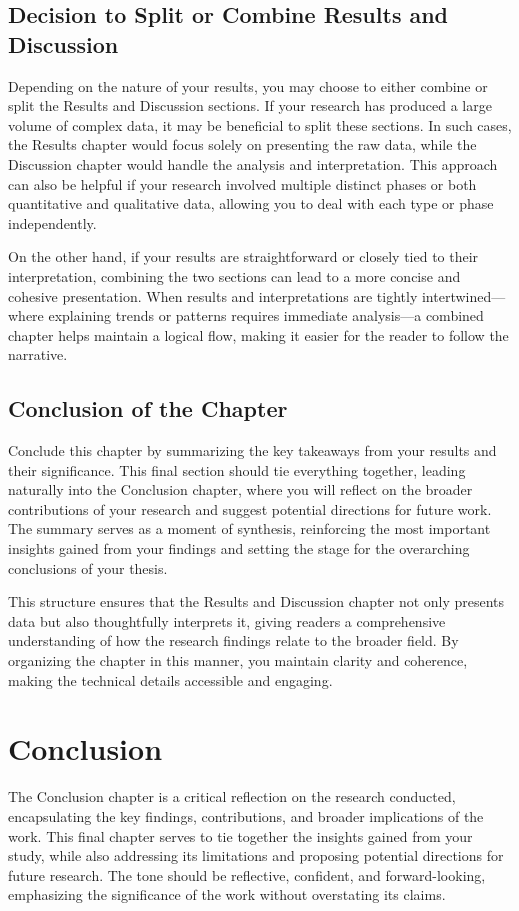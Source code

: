 \documentclass{iutbscthesis}
\begin{document}
\section{Decision to Split or Combine Results and Discussion}

Depending on the nature of your results, you may choose to either combine or split the Results and Discussion sections. If your research has produced a large volume of complex data, it may be beneficial to split these sections. In such cases, the Results chapter would focus solely on presenting the raw data, while the Discussion chapter would handle the analysis and interpretation. This approach can also be helpful if your research involved multiple distinct phases or both quantitative and qualitative data, allowing you to deal with each type or phase independently.

On the other hand, if your results are straightforward or closely tied to their interpretation, combining the two sections can lead to a more concise and cohesive presentation. When results and interpretations are tightly intertwined—where explaining trends or patterns requires immediate analysis—a combined chapter helps maintain a logical flow, making it easier for the reader to follow the narrative.

\section{Conclusion of the Chapter}

Conclude this chapter by summarizing the key takeaways from your results and their significance. This final section should tie everything together, leading naturally into the Conclusion chapter, where you will reflect on the broader contributions of your research and suggest potential directions for future work. The summary serves as a moment of synthesis, reinforcing the most important insights gained from your findings and setting the stage for the overarching conclusions of your thesis.

This structure ensures that the Results and Discussion chapter not only presents data but also thoughtfully interprets it, giving readers a comprehensive understanding of how the research findings relate to the broader field. By organizing the chapter in this manner, you maintain clarity and coherence, making the technical details accessible and engaging.


\chapter{Conclusion}
The Conclusion chapter is a critical reflection on the research conducted, encapsulating the key findings, contributions, and broader implications of the work. This final chapter serves to tie together the insights gained from your study, while also addressing its limitations and proposing potential directions for future research. The tone should be reflective, confident, and forward-looking, emphasizing the significance of the work without overstating its claims.
\end{document}
